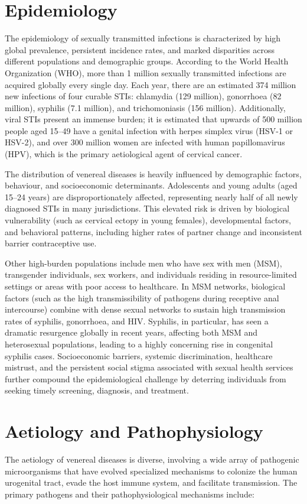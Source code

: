 \section*{Epidemiology}
The epidemiology of sexually transmitted infections is characterized by high global prevalence, persistent incidence rates, and marked disparities across different populations and demographic groups. According to the World Health Organization (WHO), more than 1 million sexually transmitted infections are acquired globally every single day. Each year, there are an estimated 374 million new infections of four curable STIs: chlamydia (129 million), gonorrhoea (82 million), syphilis (7.1 million), and trichomoniasis (156 million). Additionally, viral STIs present an immense burden; it is estimated that upwards of 500 million people aged 15--49 have a genital infection with herpes simplex virus (HSV-1 or HSV-2), and over 300 million women are infected with human papillomavirus (HPV), which is the primary aetiological agent of cervical cancer.

The distribution of venereal diseases is heavily influenced by demographic factors, behaviour, and socioeconomic determinants. Adolescents and young adults (aged 15--24 years) are disproportionately affected, representing nearly half of all newly diagnosed STIs in many jurisdictions. This elevated risk is driven by biological vulnerability (such as cervical ectopy in young females), developmental factors, and behavioral patterns, including higher rates of partner change and inconsistent barrier contraceptive use.

Other high-burden populations include men who have sex with men (MSM), transgender individuals, sex workers, and individuals residing in resource-limited settings or areas with poor access to healthcare. In MSM networks, biological factors (such as the high transmissibility of pathogens during receptive anal intercourse) combine with dense sexual networks to sustain high transmission rates of syphilis, gonorrhoea, and HIV. Syphilis, in particular, has seen a dramatic resurgence globally in recent years, affecting both MSM and heterosexual populations, leading to a highly concerning rise in congenital syphilis cases. Socioeconomic barriers, systemic discrimination, healthcare mistrust, and the persistent social stigma associated with sexual health services further compound the epidemiological challenge by deterring individuals from seeking timely screening, diagnosis, and treatment.

\section*{Aetiology and Pathophysiology}
The aetiology of venereal diseases is diverse, involving a wide array of pathogenic microorganisms that have evolved specialized mechanisms to colonize the human urogenital tract, evade the host immune system, and facilitate transmission. The primary pathogens and their pathophysiological mechanisms include:

